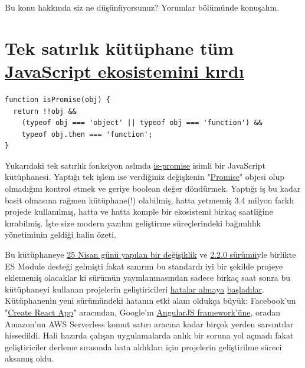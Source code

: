 \documentclass[11pt]{article}
\begin{document}
Bu konu hakkında siz ne düşünüyorsunuz? Yorumlar bölümünde konuşalım.
\section{Tek satırlık kütüphane tüm \href{https://www.zdnet.com/article/another-one-line-npm-package-breaks-the-javascript-ecosystem/}{JavaScript ekosistemini kırdı}}
\label{sec:org886b5a3}
\begin{verbatim}
function isPromise(obj) {
  return !!obj &&
    (typeof obj === 'object' || typeof obj === 'function') &&
    typeof obj.then === 'function';
}
\end{verbatim}

Yukarıdaki tek satırlık fonksiyon aslında \href{https://github.com/then/is-promise}{is-promise} isimli bir JavaScript
kütüphanesi. Yaptığı tek işlem ise verdiğiniz değişkenin "\href{https://developer.mozilla.org/en-US/docs/Web/JavaScript/Reference/Global\_Objects/Promise}{Promise}" objesi olup
olmadığını kontrol etmek ve geriye boolean değer döndürmek. Yaptığı iş bu
kadar basit olmasına rağmen kütüphane(!) olabilmiş, hatta yetmemiş 3.4 milyon
farklı projede kullanılmış, hatta ve hatta komple bir ekosistemi birkaç
saatliğine kırabilmiş. İşte size modern yazılım geliştirme süreçlerindeki
bağımlılık yönetiminin geldiği halin özeti.

Bu kütüphaneye \href{https://github.com/then/is-promise/commit/feb90a40501c8ef69b0c65bdf1eb703182214407}{25 Nisan günü yapılan bir değişiklik} ve \href{https://github.com/then/is-promise/releases/tag/2.2.0}{2.2.0 sürümü}yle
birlikte ES Module desteği gelmişti fakat sanırım bu standardı iyi bir şekilde
projeye eklememiş olacaklar ki sürümün yayınlanmasından sadece birkaç saat
sonra bu kütüphaneyi kullanan projelerin geliştiricileri \href{https://github.com/then/is-promise/issues/12}{hatalar almaya}
\href{https://github.com/then/is-promise/issues/13}{başladılar}. Kütüphanenin yeni sürümündeki hatanın etki alanı oldukça büyük:
Facebook'un "\href{https://github.com/facebook/create-react-app/issues/8896\#issuecomment-619406384}{Create React App}" aracından, Google'ın \href{https://github.com/then/is-promise/issues/23}{AngularJS framework'üne},
oradan Amazon'un AWS Serverless komut satırı aracına kadar birçok yerden
sarsıntılar hissedildi. Hali hazırda çalışan uygulamalarda anlık bir soruna
yol açmadı fakat geliştiriciler derleme sırasında hata aldıkları için
projelerin geliştirilme süreci aksamış oldu.
\end{document}
